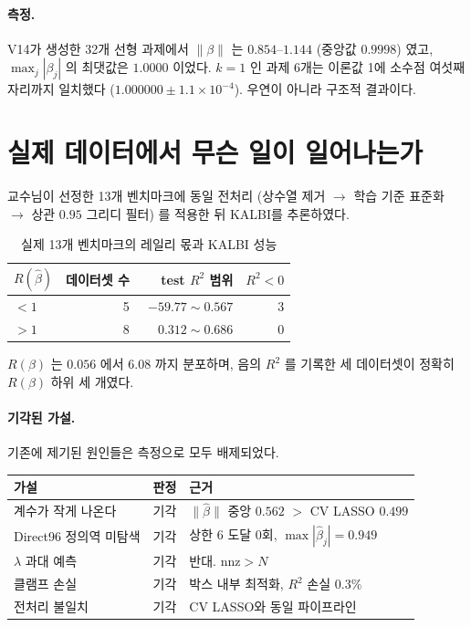 \documentclass[11pt]{article}
\newcommand{\Rq}{R(\beta)}
\newcommand{\bhat}{\hat{\beta}}
\begin{document}
\paragraph{측정.}
V14가 생성한 32개 선형 과제에서 $\|\beta\|$ 는 $0.854$--$1.144$
(중앙값 $0.9998$) 였고, $\max_j |\beta_j|$ 의 최댓값은 $1.0000$ 이었다.
$k=1$ 인 과제 6개는 이론값 1에 소수점 여섯째 자리까지 일치했다
($1.000000 \pm 1.1\times10^{-4}$). 우연이 아니라 구조적 결과이다.

\section{실제 데이터에서 무슨 일이 일어나는가}

교수님이 선정한 13개 벤치마크에 동일 전처리
(상수열 제거 $\to$ 학습 기준 표준화 $\to$ 상관 $0.95$ 그리디 필터)
를 적용한 뒤 KALBI를 추론하였다.

\begin{table}[h]
\centering
\caption{실제 13개 벤치마크의 레일리 몫과 KALBI 성능}
\begin{tabular}{@{}lrrr@{}}
\toprule
$R(\bhat)$ & 데이터셋 수 & test $R^2$ 범위 & $R^2 < 0$ \\
\midrule
$< 1$  & 5 & $-59.77 \sim 0.567$ & 3 \\
$> 1$  & 8 & $\phantom{-}0.312 \sim 0.686$ & 0 \\
\bottomrule
\end{tabular}
\end{table}

$\Rq$ 는 $0.056$ 에서 $6.08$ 까지 분포하며,
음의 $R^2$ 를 기록한 세 데이터셋이 정확히 $\Rq$ 하위 세 개였다.

\paragraph{기각된 가설.}
기존에 제기된 원인들은 측정으로 모두 배제되었다.

\begin{table}[h]
\centering
\begin{tabular}{@{}lll@{}}
\toprule
가설 & 판정 & 근거 \\
\midrule
계수가 작게 나온다 & 기각 & $\|\bhat\|$ 중앙 $0.562$ $>$ CV LASSO $0.499$ \\
Direct96 정의역 미탐색 & 기각 & 상한 6 도달 0회, $\max|\bhat_j| = 0.949$ \\
$\lambda$ 과대 예측 & 기각 & 반대. $\mathrm{nnz} > N$ \\
클램프 손실 & 기각 & 박스 내부 최적화, $R^2$ 손실 $0.3\%$ \\
전처리 불일치 & 기각 & CV LASSO와 동일 파이프라인 \\
\bottomrule
\end{tabular}
\end{table}
\end{document}
